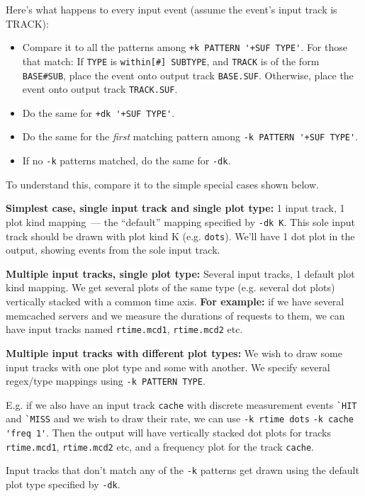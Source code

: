 \documentclass{article}
\begin{document}
Here's what happens to every input event (assume the event's input track is TRACK):
\begin{itemize}
\item Compare it to all the patterns among \verb|+k PATTERN '+SUF TYPE'|. For those that match:
\subitem If \verb|TYPE| is \verb|within[#] SUBTYPE|, and \verb|TRACK| is of the form \verb|BASE#SUB|, place the event onto output track \verb|BASE.SUF|.
\subitem Otherwise, place the event onto output track \verb|TRACK.SUF|.
\item Do the same for \verb|+dk '+SUF TYPE'|.
\item Do the same for the \emph{first} matching pattern among \verb|-k PATTERN '+SUF TYPE'|.
\item If no \verb|-k| patterns matched, do the same for \verb|-dk|.
\end{itemize}

To understand this, compare it to the simple special cases shown below.

\textbf{Simplest case, single input track and single plot type:} 1 input track, 1 plot kind mapping~--- the ``default'' mapping specified by \verb|-dk K|. This sole input track should be drawn with plot kind K (e.g. \verb|dots|). We'll have 1 dot plot in the output, showing events from the sole input track.

\textbf{Multiple input tracks, single plot type:} Several input tracks, 1 default plot kind mapping. We get several plots of the same type (e.g. several dot plots) vertically stacked with a common time axis. \textbf{For example:} if we have several memcached servers and we measure the durations of requests to them, we can have input tracks named \verb|rtime.mcd1|, \verb|rtime.mcd2| etc.

\textbf{Multiple input tracks with different plot types:} We wish to draw some input tracks with one plot type and some with another. We specify several regex/type mappings using \verb|-k PATTERN TYPE|. 

E.g. if we also have an input track \verb|cache| with discrete measurement events \verb|`HIT| and \verb|`MISS| and we wish to draw their rate, we can use \verb|-k rtime dots| \verb|-k cache 'freq 1'|. Then the output will have vertically stacked dot plots for tracks \verb|rtime.mcd1|, \verb|rtime.mcd2| etc, and a frequency plot for the track \verb|cache|. 

Input tracks that don't match any of the \verb|-k| patterns get drawn using the default plot type specified by \verb|-dk|.
\end{document}
